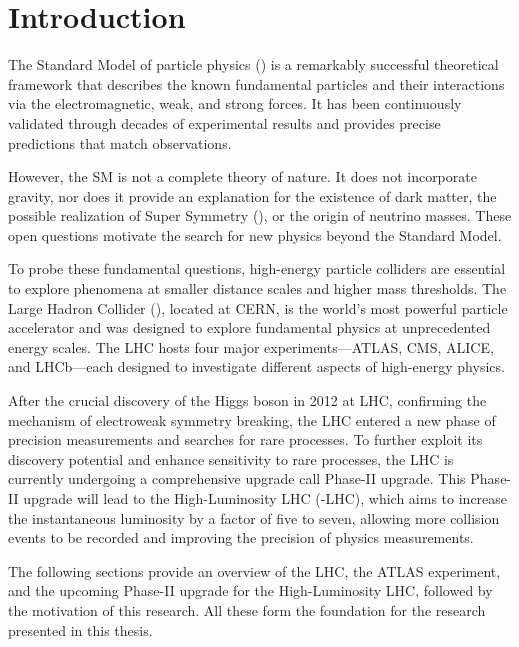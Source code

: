 \chapter{Introduction} \label{ch:introduction}
The Standard Model of particle physics (\SM) is a remarkably successful theoretical framework that describes the known fundamental particles and their interactions via the electromagnetic, weak, and strong forces. It has been continuously validated through decades of experimental results and provides precise predictions that match observations.

However, the SM is not a complete theory of nature. It does not incorporate gravity, nor does it provide an explanation for the existence of dark matter, the possible realization of Super Symmetry (\SUSY), or the origin of neutrino masses. These open questions motivate the search for new physics beyond the Standard Model.

To probe these fundamental questions, high-energy particle colliders are essential to explore phenomena at smaller distance scales and higher mass thresholds. The Large Hadron Collider (\LHC), located at CERN, is the world's most powerful particle accelerator and was designed to explore fundamental physics at unprecedented energy scales. The LHC hosts four major experiments—ATLAS, CMS, ALICE, and LHCb—each designed to investigate different aspects of high-energy physics.

After the crucial discovery of the Higgs boson in 2012 at LHC, confirming the mechanism of electroweak symmetry breaking, the LHC entered a new phase of precision measurements and searches for rare processes. To further exploit its discovery potential and enhance sensitivity to rare processes, the LHC is currently undergoing a comprehensive upgrade call Phase-II upgrade. This Phase-II upgrade will lead to the High-Luminosity LHC (\HL-LHC), which aims to increase the instantaneous luminosity by a factor of five to seven, allowing more collision events to be recorded and improving the precision of physics measurements.

The following sections provide an overview of the LHC, the ATLAS experiment, and the upcoming Phase-II upgrade for the High-Luminosity LHC, followed by the motivation of this research. All these form the foundation for the research presented in this thesis.
